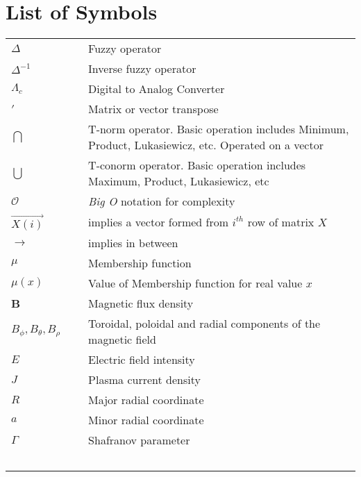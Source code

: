 \chapter{List of Symbols}

\begin{table}[ht]
	\centering
	\begin{tabular}{l l p{10cm}}
		$\Delta $ & ~ & Fuzzy operator \\
		$\Delta ^{-1}$ & ~ & Inverse fuzzy operator \\
		$\Lambda_c$ & ~ & Digital to Analog Converter \\
		$'$ & ~ & Matrix or vector transpose \\
		$\bigcap {} $ & ~ & T-norm operator. Basic operation includes Minimum, Product, Lukasiewicz, etc. Operated on a vector \\
		$ \bigcup {} $ & ~ & T-conorm operator. Basic operation includes Maximum, Product, Lukasiewicz, etc \\
		$ \mathcal{O} $ & ~ & \emph{Big O} notation for complexity \\
		$ \overrightarrow {X(i)} $ & ~ &  implies a vector formed from $ i^{th} $ row of matrix $ X $ \\
		$\to$ & ~ & implies in between \\
		$ \mu $ & ~ & Membership function \\
		$ \mu\left( x\right) $ & ~ & Value of Membership function for real value $x$ \\
		\textbf{B} & ~ & Magnetic flux density \\
		$ B_\phi, B_\theta, B_\rho $ & ~ & Toroidal, poloidal and radial components of the magnetic field\\
		$E$ & ~ & Electric field intensity\\
		$ J $ & ~ & Plasma current density\\
		$ R $ & ~ & Major radial coordinate\\
		$ a $ & ~ & Minor radial coordinate\\
		$\Gamma $ & ~ & Shafranov parameter \\
		~ & ~ & ~
	\end{tabular}
\end{table}